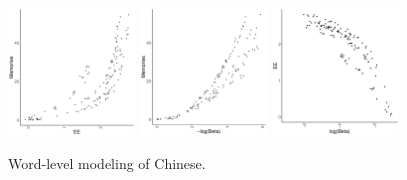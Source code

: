 \documentclass[11pt,letterpaper]{article}
\begin{document}
\begin{figure}
\includegraphics[width=0.3\textwidth]{code/figures/LDC2012T05-words-ee-mem.pdf}
\includegraphics[width=0.3\textwidth]{code/figures/LDC2012T05-words-logbeta-mem.pdf}
\includegraphics[width=0.3\textwidth]{code/figures/LDC2012T05-words-logbeta-ee.pdf}
	\caption{Word-level modeling of Chinese.}\label{fig:jap-logbeta}
\end{figure}
\end{document}
